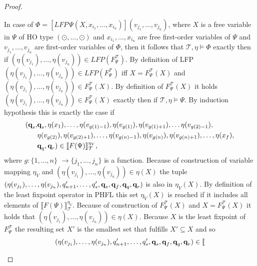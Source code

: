 \begin{proof}
\begin{compactitem}
        \item In case of $\Phi = [LFP\,\Psi(X, x_{i_1}, \dots, x_{i_n})](v_{j_1}, \dots, v_{j_n})$, where $X$ is a
        free variable in $\Psi$ of HO type $(\odot, \dots, \odot)$ and $x_{i_1}, \dots, x_{i_n}$ are free first-order
        variables of $\Psi$ and $v_{j_1}, \dots, v_{j_n}$ are first-order variables of $\Phi$, then it follows that
        $\mathcal{T}, \eta \models \Phi$ exactly then if $(\eta(v_{j_1}), \dots, \eta(v_{j_n})) \in LFP
        (F_\Psi^\mathcal{T})$. By definition of LFP $(\eta(v_{j_1}), \dots, \eta(v_{j_n})) \in
        LFP(F_\Psi^\mathcal{T})$ iff $X = F_\Psi^\mathcal{T}(X)$ and $(\eta(v_{j_1}), \dots, \eta(v_{j_n})) \in
        F_\Psi^\mathcal{T}(X)$. By definition of $F_\Psi^\mathcal{T}(X)$ it holds $(\eta
        (v_{j_1}), \dots, \eta(v_{j_n})) \in F_\Psi^\mathcal{T}(X)$ exactly then if $\mathcal{T}, \eta 
        \models \Psi$. By induction hypothesis this is exactly the case if
        \begin{align*}
        (\emph{q}_s, &\emph{q}_s, \eta(x_1), \dots, \eta(v_{g(1)-1}), \eta(v_{g(1)}), \eta(v_{g(1)+1}), \dots \eta(v_{g(2)-1}),\\& \eta
            (v_{g(2)}), \eta(v_{g(2)+1}), \dots, \eta(v_{g(n)-1}), \eta(v_{g(n)}), \eta(v_{g(n)+1}), \dots, \eta
            (x_f), \\&\emph{q}_q, \emph{q}_r) \in \llbracket
        F(\Psi) \rrbracket^{\eta_V}_\mathcal{T},
        \end{align*}
         where $g: \{1, \dots, n\} $ $\rightarrow \{j_1, \dots, j_n\}$ is a function.
        Because of construction of variable mapping $\eta_V$ and $(\eta(v_{j_1}), \dots, 
        \eta(v_{j_n})) \in \eta(X)$ the
        tuple $(\eta(v_{j_1}), \dots, \eta(v_{j_n}), q_{n+1}', \dots, q_s', \emph{q}_s, \emph{q}_f,  
        \emph{q}_q,  \emph{q}_r)$ is also in $\eta_V(X)$. By definition of the least fixpoint 
        operator in PHFL this set $\eta_V(X)$ is reached if it includes all
        elements of $\llbracket F(\Psi) \rrbracket^{\eta_V}_\mathcal{T}$. Because of
        construction of $F_\Psi^\mathcal{T}(X)$ and $X = F_\Psi^\mathcal{T}(X)$ it holds that $(\eta(v_{j_1}),
        \dots, \eta(v_{j_n})) \in \eta(X)$.
        Because $X$ is the least fixpoint of $F_\Psi^\mathcal{T}$ the resulting set $X'$ is the smallest set that
        fulfills $X' \subseteq X$ and so
        \begin{align*}
        (\eta(v_{j_1}), \dots, \eta(v_{j_n}), q_{n+1}', \dots, q_s', \emph{q}_s, \emph{q}_f,  \emph{q}_q,  \emph{q}_r) \in \llbracket

\end{align*}
\end{compactitem}
\end{proof}
